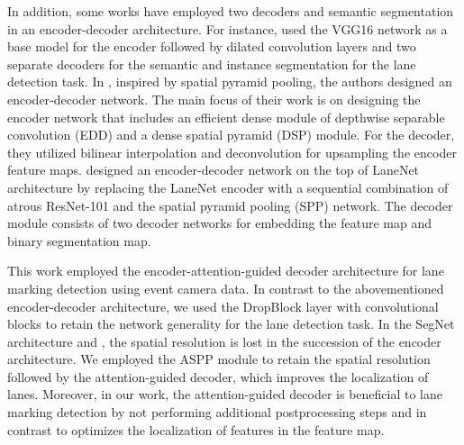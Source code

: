 \documentclass[journal]{IEEEtran}
\begin{document}
 In addition, some works have employed two decoders and semantic segmentation in an encoder-decoder architecture. For instance, \cite{ding2020lane} used the VGG16 network as a base model for the encoder followed by dilated convolution layers and two separate decoders for the semantic and instance segmentation for the lane detection task. In \cite{li2020efficient}, inspired by spatial pyramid pooling, the authors designed an encoder-decoder network. The main focus of their work is on designing the encoder network that includes an efficient dense module of depthwise separable convolution (EDD) and a dense spatial pyramid (DSP) module. For the decoder, they utilized bilinear interpolation and deconvolution for upsampling the encoder feature maps. \cite{sun2019accurate} designed an encoder-decoder network on the top of LaneNet architecture by replacing the LaneNet encoder with a sequential combination of atrous ResNet-101 and the spatial pyramid pooling (SPP) network. The decoder module consists of two decoder networks for embedding the feature map and binary segmentation map.
\par 
This work employed the encoder-attention-guided decoder architecture for lane marking detection using event camera data. In contrast to the abovementioned encoder-decoder architecture, we used the DropBlock layer with convolutional blocks to retain the network generality for the lane detection task. In the SegNet \cite{badrinarayanan2017segnet} architecture and \cite{chougule2018efficient}, the spatial resolution is lost in the succession of the encoder architecture. We employed the ASPP module to retain the spatial resolution followed by the attention-guided decoder, which improves the localization of lanes. Moreover, in our work, the attention-guided decoder is beneficial to lane marking detection by not performing additional postprocessing steps and in contrast to \cite{ding2020lane}\cite{li2020efficient}\cite{sun2019accurate} optimizes the localization of features in the feature map.

\par
\end{document}
